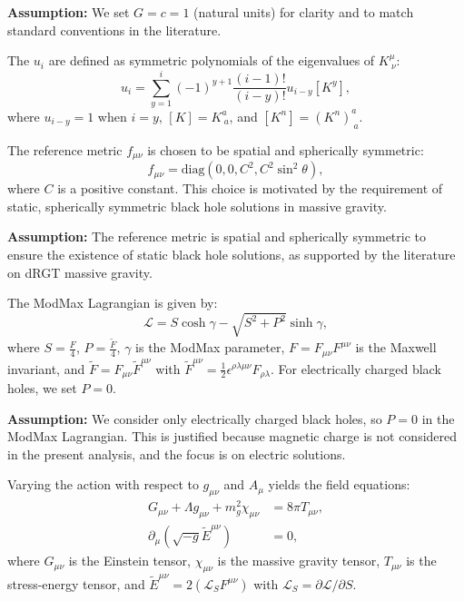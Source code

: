 \documentclass[12pt]{article}
\begin{document}
\textbf{Assumption:} We set $G = c = 1$ (natural units) for clarity and to match standard conventions in the literature.

The $u_i$ are defined as symmetric polynomials of the eigenvalues of $K^\mu_{\ \nu}$:
\begin{equation}
u_i = \sum_{y=1}^i (-1)^{y+1} \frac{(i-1)!}{(i-y)!} u_{i-y} [K^y],
\end{equation}
where $u_{i-y} = 1$ when $i = y$, $[K] = K^a_{\ a}$, and $[K^n] = (K^n)^a_{\ a}$.

The reference metric $f_{\mu\nu}$ is chosen to be spatial and spherically symmetric:
\begin{equation}
f_{\mu\nu} = \mathrm{diag}(0, 0, C^2, C^2 \sin^2\theta),
\end{equation}
where $C$ is a positive constant. This choice is motivated by the requirement of static, spherically symmetric black hole solutions in massive gravity.

\textbf{Assumption:} The reference metric is spatial and spherically symmetric to ensure the existence of static black hole solutions, as supported by the literature on dRGT massive gravity.

The ModMax Lagrangian is given by:
\begin{equation}
\mathcal{L} = S \cosh\gamma - \sqrt{S^2 + P^2} \sinh\gamma,
\end{equation}
where $S = \frac{F}{4}$, $P = \frac{\tilde{F}}{4}$, $\gamma$ is the ModMax parameter, $F = F_{\mu\nu} F^{\mu\nu}$ is the Maxwell invariant, and $\tilde{F} = F_{\mu\nu} \tilde{F}^{\mu\nu}$ with $\tilde{F}^{\mu\nu} = \frac{1}{2} \epsilon^{\rho\lambda\mu\nu} F_{\rho\lambda}$. For electrically charged black holes, we set $P = 0$.

\textbf{Assumption:} We consider only electrically charged black holes, so $P = 0$ in the ModMax Lagrangian. This is justified because magnetic charge is not considered in the present analysis, and the focus is on electric solutions.

Varying the action with respect to $g_{\mu\nu}$ and $A_\mu$ yields the field equations:
\begin{align}
G_{\mu\nu} + \Lambda g_{\mu\nu} + m_g^2 \chi_{\mu\nu} &= 8\pi T_{\mu\nu}, \\
\partial_\mu \left( \sqrt{-g} \tilde{E}^{\mu\nu} \right) &= 0,
\end{align}
where $G_{\mu\nu}$ is the Einstein tensor, $\chi_{\mu\nu}$ is the massive gravity tensor, $T_{\mu\nu}$ is the stress-energy tensor, and $\tilde{E}^{\mu\nu} = 2 (\mathcal{L}_S F^{\mu\nu})$ with $\mathcal{L}_S = \partial \mathcal{L}/\partial S$.
\end{document}
